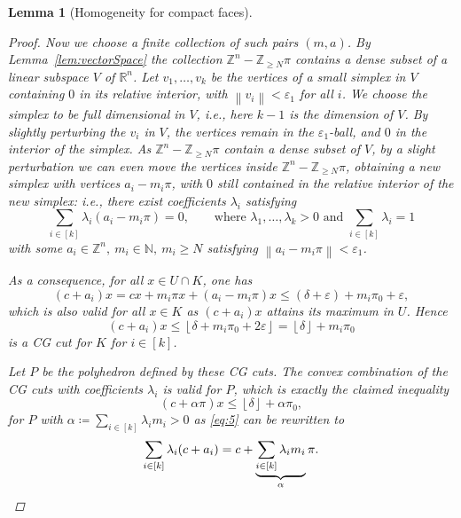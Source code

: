 \documentclass[11pt]{article}
\newtheorem{lem}[thm]{Lemma}
\theoremstyle{remark}
\begin{document}
\begin{lem}[Homogeneity for compact faces]
\begin{proof}
Now we choose a finite collection of such pairs \((m, a)\).
By Lemma~\ref{lem:vectorSpace}
the collection \({\mathbb{Z}}^{n} - {\mathbb{Z}}_{{} \geq N} \pi\)
contains a dense subset of
a linear subspace \(V\) of \({\mathbb{R}}^{n}\).
Let \(v_{1}, \dotsc, v_{k}\) be the vertices of a small simplex in \(V\)
containing \(0\) in its relative interior,
with \({\left\lVert{v_{i}}\right\rVert} < \varepsilon_{1}\) for all \(i\).
We choose the simplex to be full dimensional in \(V\),
i.e., here \(k-1\) is the dimension of \(V\).
By slightly perturbing the \(v_{i}\) in \(V\),
the vertices remain in the \(\varepsilon_{1}\)-ball,
and \(0\) in the interior of the simplex.
As \({\mathbb{Z}}^{n} - {\mathbb{Z}}_{{} \geq N} \pi\) contain a dense subset of \(V\),
by a slight perturbation we can even move the vertices
inside \({\mathbb{Z}}^{n} - {\mathbb{Z}}_{{} \geq N} \pi\),
obtaining a new simplex with vertices \(a_{i} - m_{i} \pi\),
with \(0\) still contained
in the relative interior of the new simplex:
i.e., there exist coefficients \(\lambda_{i}\) satisfying
\begin{equation}
  \label{eq:5}
  \sum_{i \in [k]} \lambda_{i} (a_{i} - m_{i} \pi) = 0,
\qquad \text{where }\lambda_{1},\dots,\lambda_k > 0 \text{ and } \sum_{i \in [k]}\lambda_i = 1
\end{equation}
with some \(a_{i} \in {\mathbb{Z}}^{n}, \ m_i \in {\mathbb{N}},\ m_{i} \geq N\)
satisfying \(
  {\left\lVert{a_{i} - m_{i} \pi}\right\rVert} < \varepsilon_{1}\).

As a consequence, for all \(x \in U \cap K\), one has
\begin{equation}
  \label{eq:2}
  (c + a_{i}) x = c x + m_{i} \pi x + (a_{i} - m_{i} \pi) x
  \leq (\delta + \varepsilon) + m_{i} \pi_{0} + \varepsilon,
\end{equation}
which is also valid for all \(x \in K\) as \((c + a_{i})x\)
attains its maximum in \(U\).
Hence
\begin{equation*}
  (c + a_{i}) x \leq {\left\lfloor{\delta + m_{i} \pi_{0} + 2 \varepsilon}\right\rfloor}
  = {\left\lfloor{\delta}\right\rfloor} + m_{i} \pi_{0}
\end{equation*}
is a {CG\xspace} cut for \(K\) for \(i \in [k]\).

Let \(P\) be the polyhedron defined by these {CG\xspace} cuts.
The convex combination of the {CG\xspace} cuts
with coefficients \(\lambda_{i}\)
is valid for \(P\),
which is exactly the claimed inequality 
\begin{equation*}
  (c + \alpha \pi) x \leq {\left\lfloor{\delta}\right\rfloor} + \alpha \pi_{0},
\end{equation*}
for \(P\) with \(\alpha \coloneqq \sum_{i \in [k]} \lambda_{i} m_{i} > 0\) as
\eqref{eq:5} can be rewritten to
\begin{equation*}
  \sum_{i \in [k]} \lambda_{i} (c + a_{i}) =
  c + \underbrace{\sum_{i \in [k]} \lambda_{i}  m_{i}}_{\alpha} \pi.
  \qedhere
\end{equation*}
\end{proof}
\end{lem}
\end{document}
